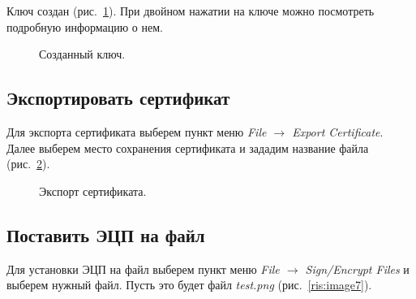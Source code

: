 \documentclass[10pt,a4paper,titlepage]{article}
\begin{document}
\pagebreak
Ключ создан \mbox{(рис. \ref{ris:image5})}. При двойном нажатии на ключе можно посмотреть подробную информацию о нем.

\begin{figure}[!h]	
\caption{Созданный ключ.}
\label{ris:image5}
\end{figure}

\subsection{Экспортировать сертификат}
Для экспорта сертификата выберем пункт меню \textit{File $\rightarrow$ Export Certificate}. Далее выберем место сохранения сертификата и зададим название файла \mbox{(рис. \ref{ris:image6})}.

\begin{figure}[!h]	
\caption{Экспорт сертификата.}
\label{ris:image6}
\end{figure}

\pagebreak
\subsection{Поставить ЭЦП на файл}
Для установки ЭЦП на файл выберем пункт меню \textit{File $\rightarrow$ Sign/Encrypt Files} и выберем нужный файл. Пусть это будет файл \textit{test.png} \mbox{(рис. \ref{ris:image7})}.
\end{document}
